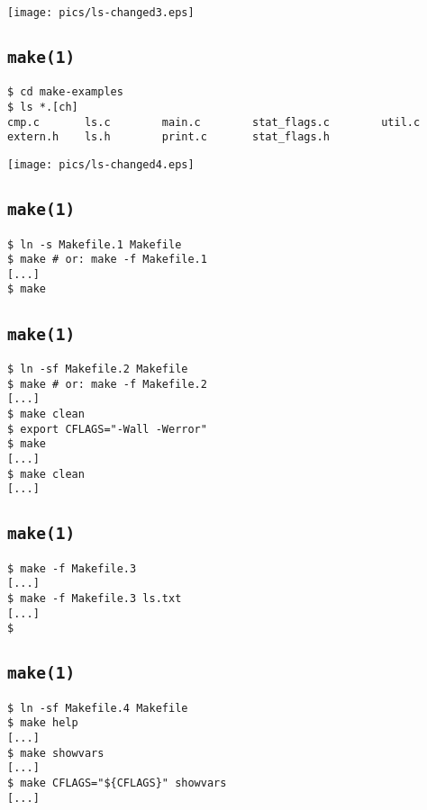 \documentclass[xga]{xdvislides}
\newcommand{\smallish}{\fontsize{18}{18}\selectfont}
\begin{document}
\begin{center}
	\texttt{[image: pics/ls-changed3.eps]}
\end{center}

\subsection{{\tt make(1)}}

\begin{verbatim}
$ cd make-examples
$ ls *.[ch]
cmp.c       ls.c        main.c        stat_flags.c        util.c
extern.h    ls.h        print.c       stat_flags.h
\end{verbatim}

\begin{center}
	\texttt{[image: pics/ls-changed4.eps]}
\end{center}

\subsection{{\tt make(1)}}
\begin{verbatim}
$ ln -s Makefile.1 Makefile
$ make # or: make -f Makefile.1
[...]
$ make
\end{verbatim}

\subsection{{\tt make(1)}}
\begin{verbatim}
$ ln -sf Makefile.2 Makefile
$ make # or: make -f Makefile.2
[...]
$ make clean
$ export CFLAGS="-Wall -Werror"
$ make
[...]
$ make clean
[...]
\end{verbatim}

\subsection{{\tt make(1)}}
\begin{verbatim}
$ make -f Makefile.3
[...]
$ make -f Makefile.3 ls.txt
[...]
$
\end{verbatim}

\subsection{{\tt make(1)}}
\smallish
\begin{verbatim}
$ ln -sf Makefile.4 Makefile
$ make help
[...]
$ make showvars
[...]
$ make CFLAGS="${CFLAGS}" showvars
[...]
\end{verbatim}
\Normalsize
\end{document}

